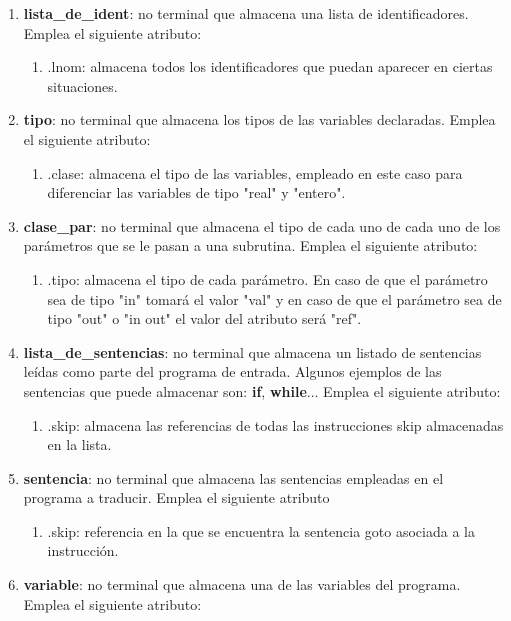 \documentclass[12pt,a4paper,landscape]{article}
\theoremstyle{mytheor}
\begin{document}
\begin{enumerate}
  \item \textbf{lista\_de\_ident}: no terminal que almacena una lista de identificadores. Emplea el siguiente atributo:
  \begin{enumerate}
    \item .lnom: almacena todos los identificadores que puedan aparecer en ciertas situaciones.
  \end{enumerate}
  \item \textbf{tipo}: no terminal que almacena los tipos de las variables declaradas. Emplea el siguiente atributo:
  \begin{enumerate}
    \item .clase: almacena el tipo de las variables, empleado en este caso para diferenciar las variables de tipo "real" y "entero".
  \end{enumerate}
  \item \textbf{clase\_par}: no terminal que almacena el tipo de cada uno de cada uno de los parámetros que se le pasan a una subrutina. Emplea el siguiente atributo:
  \begin{enumerate}
    \item .tipo: almacena el tipo de cada parámetro. En caso de que el parámetro sea de tipo "in" tomará el valor "val" y en caso de que el parámetro sea de tipo "out" o "in out" el valor del atributo será "ref".
  \end{enumerate}
  \item \textbf{lista\_de\_sentencias}: no terminal que almacena un listado de sentencias leídas como parte del programa de entrada. Algunos ejemplos de las sentencias que puede almacenar son: \textbf{if}, \textbf{while}... Emplea el siguiente atributo:
  \begin{enumerate}
    \item .skip: almacena las referencias de todas las instrucciones skip almacenadas en la lista.
  \end{enumerate}
  \item \textbf{sentencia}: no terminal que almacena las sentencias empleadas en el programa a traducir. Emplea el siguiente atributo
  \begin{enumerate}
    \item .skip: referencia en la que se encuentra la sentencia goto asociada a la instrucción.
  \end{enumerate}
  \item \textbf{variable}: no terminal que almacena una de las variables del programa. Emplea el siguiente atributo:

\end{enumerate}
\end{document}
